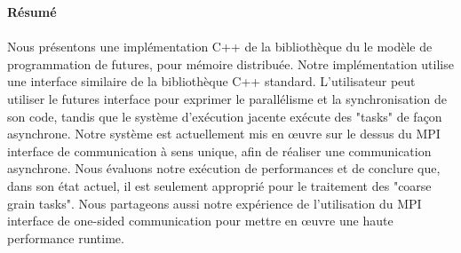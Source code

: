 \thispagestyle{empty}
\begin{titlepage}
\begin{center}
{\bf\Large Résumé}\\
\end{center}

\paragraph{}
Nous présentons une implémentation C++ de la bibliothèque du le modèle de programmation de futures, pour mémoire distribuée.
Notre implémentation utilise une interface similaire de la bibliothèque C++ standard. 
L'utilisateur peut utiliser le futures interface pour exprimer le parallélisme et la synchronisation de son code, 
tandis que le système d'exécution jacente exécute des "tasks" de façon asynchrone.
Notre système est actuellement mis en œuvre sur le dessus
du MPI interface de communication à sens unique, afin de réaliser une communication asynchrone. 
Nous évaluons notre exécution de performances et de conclure que, dans son état actuel, il est seulement approprié pour le traitement des "coarse grain tasks".
Nous partageons aussi notre expérience de l'utilisation du MPI interface de one-sided communication pour mettre en œuvre une haute performance runtime.
\vfill
\end{titlepage}


